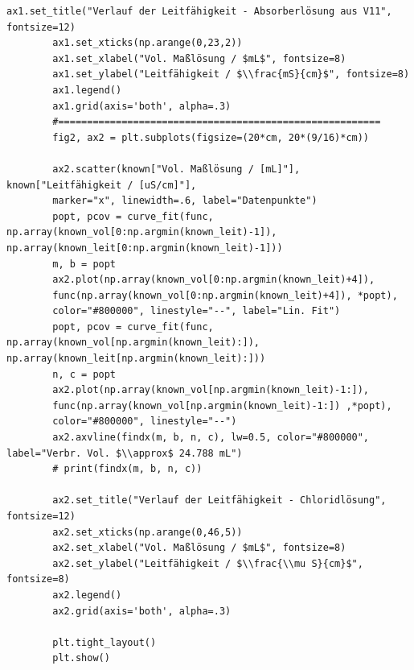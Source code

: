 \begin{lstlisting}[style=python, caption={Zur Auswertung der konduktometrischen Titration verwendeter Python-Code.}]
		ax1.set_title("Verlauf der Leitfähigkeit - Absorberlösung aus V11", fontsize=12)
		ax1.set_xticks(np.arange(0,23,2))
		ax1.set_xlabel("Vol. Maßlösung / $mL$", fontsize=8)
		ax1.set_ylabel("Leitfähigkeit / $\\frac{mS}{cm}$", fontsize=8)
		ax1.legend()
		ax1.grid(axis='both', alpha=.3)
		#========================================================
		fig2, ax2 = plt.subplots(figsize=(20*cm, 20*(9/16)*cm))

		ax2.scatter(known["Vol. Maßlösung / [mL]"], known["Leitfähigkeit / [uS/cm]"],
		marker="x", linewidth=.6, label="Datenpunkte")
		popt, pcov = curve_fit(func, np.array(known_vol[0:np.argmin(known_leit)-1]), np.array(known_leit[0:np.argmin(known_leit)-1]))
		m, b = popt
		ax2.plot(np.array(known_vol[0:np.argmin(known_leit)+4]),
		func(np.array(known_vol[0:np.argmin(known_leit)+4]), *popt),
		color="#800000", linestyle="--", label="Lin. Fit")
		popt, pcov = curve_fit(func, np.array(known_vol[np.argmin(known_leit):]), np.array(known_leit[np.argmin(known_leit):]))
		n, c = popt
		ax2.plot(np.array(known_vol[np.argmin(known_leit)-1:]),
		func(np.array(known_vol[np.argmin(known_leit)-1:]) ,*popt),
		color="#800000", linestyle="--")
		ax2.axvline(findx(m, b, n, c), lw=0.5, color="#800000", label="Verbr. Vol. $\\approx$ 24.788 mL")
		# print(findx(m, b, n, c))

		ax2.set_title("Verlauf der Leitfähigkeit - Chloridlösung", fontsize=12)
		ax2.set_xticks(np.arange(0,46,5))
		ax2.set_xlabel("Vol. Maßlösung / $mL$", fontsize=8)
		ax2.set_ylabel("Leitfähigkeit / $\\frac{\\mu S}{cm}$", fontsize=8)
		ax2.legend()
		ax2.grid(axis='both', alpha=.3)

		plt.tight_layout()
		plt.show()
	\end{lstlisting}
	\clearpage
